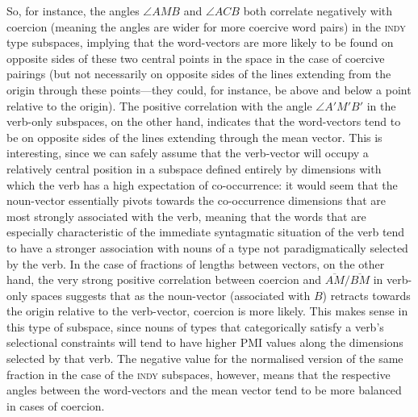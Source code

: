 So, for instance, the angles $\angle AMB$ and $\angle ACB$ both correlate negatively with coercion (meaning the angles are wider for more coercive word pairs) in the \textsc{indy} type subspaces, implying that the word-vectors are more likely to be found on opposite sides of these two central points in the space in the case of coercive pairings (but not necessarily on opposite sides of the lines extending from the origin through these points---they could, for instance, be above and below a point relative to the origin).  The positive correlation with the angle $\angle A'M'B'$ in the verb-only subspaces, on the other hand, indicates that the word-vectors tend to be on opposite sides of the lines extending through the mean vector.  This is interesting, since we can safely assume that the verb-vector will occupy a relatively central position in a subspace defined entirely by dimensions with which the verb has a high expectation of co-occurrence: it would seem that the noun-vector essentially pivots towards the co-occurrence dimensions that are most strongly associated with the verb, meaning that the words that are especially characteristic of the immediate syntagmatic situation of the verb tend to have a stronger association with nouns of a type not paradigmatically selected by the verb.  In the case of fractions of lengths between vectors, on the other hand, the very strong positive correlation between coercion and $\overline{AM}/\overline{BM}$ in verb-only spaces suggests that as the noun-vector (associated with $B$) retracts towards the origin relative to the verb-vector, coercion is more likely.  This makes sense in this type of subspace, since nouns of types that categorically satisfy a verb's selectional constraints will tend to have higher PMI values along the dimensions selected by that verb.  The negative value for the normalised version of the same fraction in the case of the \textsc{indy} subspaces, however, means that the respective angles between the word-vectors and the mean vector tend to be more balanced in cases of coercion.

